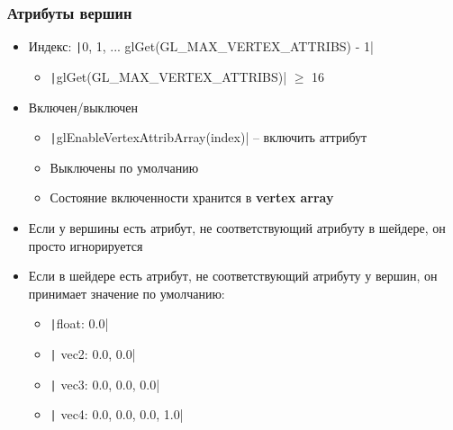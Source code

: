 \documentclass[10pt]{beamer}
\begin{document}
\begin{frame}[fragile]
\frametitle{Атрибуты вершин}
\begin{itemize}
\item Индекс: \texttt|0, 1, ... glGet(GL_MAX_VERTEX_ATTRIBS) - 1|
\begin{itemize}
\item \texttt|glGet(GL_MAX_VERTEX_ATTRIBS)| \begin{math}\geq\end{math} 16
\end{itemize}
\pause
\item Включен/выключен
\begin{itemize}
\item \texttt|glEnableVertexAttribArray(index)| -- включить аттрибут
\item Выключены по умолчанию
\item Состояние включенности хранится в \textbf{vertex array}
\end{itemize}
\pause
\item Если у вершины есть атрибут, не соответствующий атрибуту в шейдере, он просто игнорируется
\pause
\item Если в шейдере есть атрибут, не соответствующий атрибуту у вершин, он принимает значение по умолчанию:
\begin{itemize}
\item \texttt|float: 0.0|
\item \texttt| vec2: 0.0, 0.0|
\item \texttt| vec3: 0.0, 0.0, 0.0|
\item \texttt| vec4: 0.0, 0.0, 0.0, 1.0|
\end{itemize}
\end{itemize}
\end{frame}
\end{document}
